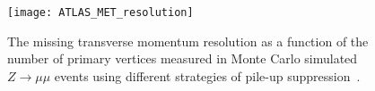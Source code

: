 \begin{figure}[ht]
  \centering
  \texttt{[image: ATLAS\_MET\_resolution]}
  \caption[ATLAS missing transverse momentum resolution.]{The missing transverse
    momentum resolution as a function of the number of primary vertices measured
    in Monte Carlo simulated $Z \to \mu\mu$ events using different strategies of
    pile-up suppression~\cite{RUNII_MET_PERF}.
  }
  \label{fig:impact-param-reso}
\end{figure}
